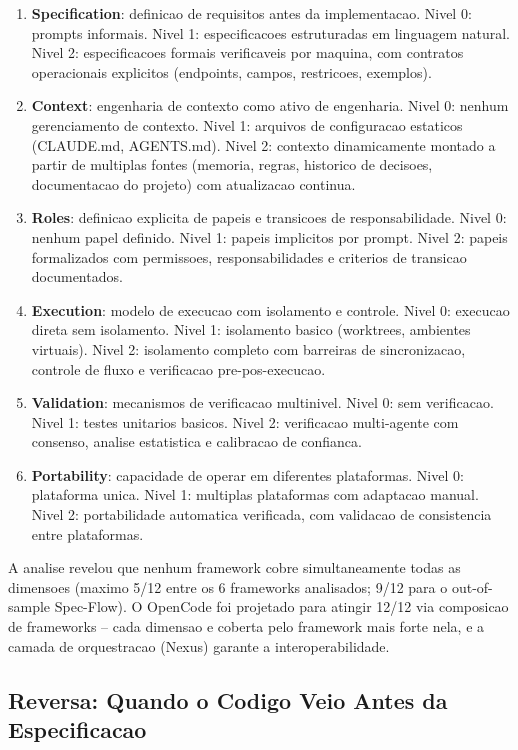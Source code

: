 \documentclass[12pt,a4paper,oneside,sumario=tradicional,chapter=TITLE,section=TITLE,subsection=TITLE,english,brazil]{abntex2}
\begin{document}
\begin{enumerate}[label=D\arabic*:,leftmargin=*]
  \item \textbf{Specification}: definicao de requisitos antes da implementacao. Nivel 0: prompts informais. Nivel 1: especificacoes estruturadas em linguagem natural. Nivel 2: especificacoes formais verificaveis por maquina, com contratos operacionais explicitos (endpoints, campos, restricoes, exemplos).
  \item \textbf{Context}: engenharia de contexto como ativo de engenharia. Nivel 0: nenhum gerenciamento de contexto. Nivel 1: arquivos de configuracao estaticos (CLAUDE.md, AGENTS.md). Nivel 2: contexto dinamicamente montado a partir de multiplas fontes (memoria, regras, historico de decisoes, documentacao do projeto) com atualizacao continua.
  \item \textbf{Roles}: definicao explicita de papeis e transicoes de responsabilidade. Nivel 0: nenhum papel definido. Nivel 1: papeis implicitos por prompt. Nivel 2: papeis formalizados com permissoes, responsabilidades e criterios de transicao documentados.
  \item \textbf{Execution}: modelo de execucao com isolamento e controle. Nivel 0: execucao direta sem isolamento. Nivel 1: isolamento basico (worktrees, ambientes virtuais). Nivel 2: isolamento completo com barreiras de sincronizacao, controle de fluxo e verificacao pre-pos-execucao.
  \item \textbf{Validation}: mecanismos de verificacao multinivel. Nivel 0: sem verificacao. Nivel 1: testes unitarios basicos. Nivel 2: verificacao multi-agente com consenso, analise estatistica e calibracao de confianca.
  \item \textbf{Portability}: capacidade de operar em diferentes plataformas. Nivel 0: plataforma unica. Nivel 1: multiplas plataformas com adaptacao manual. Nivel 2: portabilidade automatica verificada, com validacao de consistencia entre plataformas.
\end{enumerate}

A analise revelou que nenhum framework cobre simultaneamente todas as dimensoes (maximo 5/12 entre os 6 frameworks analisados; 9/12 para o out-of-sample Spec-Flow). O OpenCode foi projetado para atingir 12/12 via composicao de frameworks -- cada dimensao e coberta pelo framework mais forte nela, e a camada de orquestracao (Nexus) garante a interoperabilidade.

\subsection{Reversa: Quando o Codigo Veio Antes da Especificacao}
\end{document}
